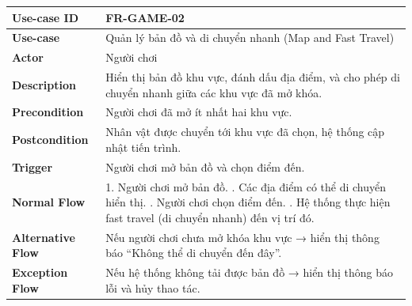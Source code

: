 \begin{table}[H]
\centering
\begin{tabular}{|p{4cm}|p{10cm}|}
\hline
\textbf{Use-case ID} & FR-GAME-02 \\ \hline
\textbf{Use-case} & Quản lý bản đồ và di chuyển nhanh (Map and Fast Travel) \\ \hline
\textbf{Actor} & Người chơi \\ \hline
\textbf{Description} & Hiển thị bản đồ khu vực, đánh dấu địa điểm, và cho phép di chuyển nhanh giữa các khu vực đã mở khóa. \\ \hline
\textbf{Precondition} & Người chơi đã mở ít nhất hai khu vực. \\ \hline
\textbf{Postcondition} & Nhân vật được chuyển tới khu vực đã chọn, hệ thống cập nhật tiến trình. \\ \hline
\textbf{Trigger} & Người chơi mở bản đồ và chọn điểm đến. \\ \hline
\textbf{Normal Flow} &
1. Người chơi mở bản đồ. \newline
2. Các địa điểm có thể di chuyển hiển thị. \newline
3. Người chơi chọn điểm đến. \newline
4. Hệ thống thực hiện fast travel (di chuyển nhanh) đến vị trí đó. \\ \hline
\textbf{Alternative Flow} &
Nếu người chơi chưa mở khóa khu vực → hiển thị thông báo “Không thể di chuyển đến đây”. \\ \hline
\textbf{Exception Flow} &
Nếu hệ thống không tải được bản đồ → hiển thị thông báo lỗi và hủy thao tác. \\ \hline
\end{tabular}
\end{table}


